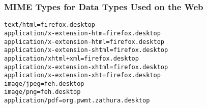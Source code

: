 \documentclass[14pt,aspectratio=169]{beamer}
\begin{document}
%
\begin{frame}[fragile]
  \frametitle{MIME Types for Data Types Used on the Web}
  \normalsize
  \begin{minipage}{6in}
    \vspace*{.05in}
    \begin{verbatim}
text/html=firefox.desktop
application/x-extension-htm=firefox.desktop
application/x-extension-html=firefox.desktop
application/x-extension-shtml=firefox.desktop
application/xhtml+xml=firefox.desktop
application/x-extension-xhtml=firefox.desktop
application/x-extension-xht=firefox.desktop
image/jpeg=feh.desktop
image/png=feh.desktop
application/pdf=org.pwmt.zathura.desktop
    \end{verbatim}
  \end{minipage}
\end{frame}
\end{document}
